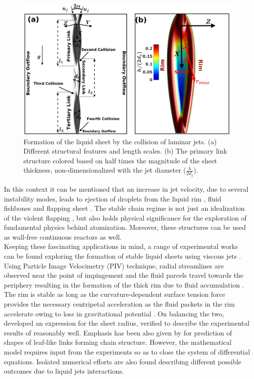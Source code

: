 \documentclass[%
 aip,
 sd,%
amsmath,amssymb,
preprint,%
author-year,%
]{revtex4-1}
\begin{document}
\begin{figure}
	\centering
	\includegraphics[width=\textwidth]{Figure1}
	\caption{Formation of the liquid sheet by the collision of laminar jets. (a) Different structural features and length scales. (b) The primary link structure colored based on half times the magnitude of the sheet thickness, non-dimensionalized with the jet diameter ($\frac{h}{2d_j}$).}
	\label{Figure::schematic}
\end{figure}
In this context it can be mentioned that an increase in jet velocity, due to several instability modes, leads {\color{red}to} ejection of droplets from the liquid rim \citep{bremond2006atomization}, fluid fishbones \citep{bush2004collision} and flapping sheet \citep{villermaux2002life}. The stable chain regime is not just an idealization of the violent flapping \citep{ibrahim1991impinging}, but also holds physical significance for the exploration of fundamental physics behind atomization. Moreover, these structures can be used as wall-free continuous reactors \citep{erni2013free} as well.\\
Keeping these fascinating applications in mind, a range of experimental works can be found exploring the formation of stable liquid sheets using viscous jets \citep{choo2001parametric,choo2002velocity,bush2004collision}. Using Particle Image Velocimetry (PIV) technique, radial streamlines are observed near the point of impingement and the fluid parcels travel towards the periphery resulting in the formation of the thick rim due to fluid accumulation \citep{choo2002velocity,bush2004collision}. The rim is stable as long as the curvature{\color{red}-dependent} surface tension {\color{red}force} provides the necessary centripetal acceleration as the fluid packets in the rim accelerate owing to loss in gravitational potential \citep{bremond2006atomization}. On balancing the two, \cite{taylor1960formation} developed an expression for the sheet radius, verified to describe the experimental results of \cite{bush2004collision} reasonably well. Emphasis has been also given by \cite{bush2004collision} for prediction of shapes of leaf-like links forming chain structure. However, the mathematical model requires input from the experiments so as to close the system of differential equations. Isolated numerical efforts are also found describing different possible outcomes due to liquid jets interactions.\\
\end{document}
